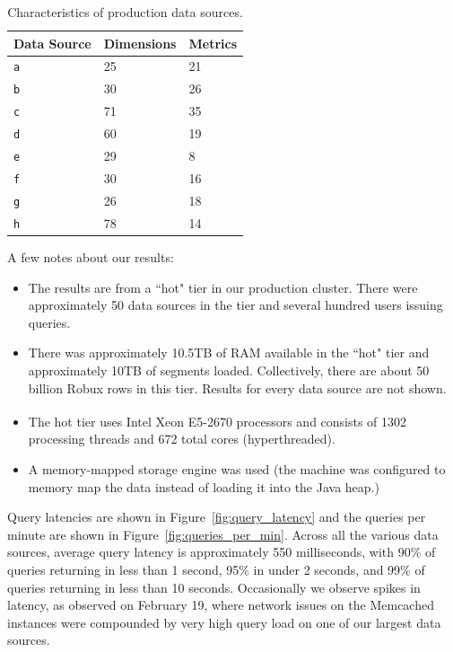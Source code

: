 \documentclass{sig-alternate-2013}
\begin{document}
\begin{table}
  \centering
  \scriptsize\begin{tabular}{| l | l | l |}
    \hline
    \textbf{Data Source} & \textbf{Dimensions} & \textbf{Metrics} \\ \hline
    \texttt{a} & 25 & 21 \\ \hline
    \texttt{b} & 30 & 26 \\ \hline
    \texttt{c} & 71 & 35 \\ \hline
    \texttt{d} & 60 & 19 \\ \hline
    \texttt{e} & 29 & 8 \\ \hline
    \texttt{f} & 30 & 16 \\ \hline
    \texttt{g} & 26 & 18 \\ \hline
    \texttt{h} & 78 & 14 \\ \hline
  \end{tabular}
  \normalsize
  \caption{Characteristics of production data sources.}
  \label{tab:datasources}
\end{table}

A few notes about our results:
\begin{itemize}[leftmargin=*,beginpenalty=5000,topsep=0pt]
\item The results are from a ``hot" tier in our production cluster. There were
approximately 50 data sources in the tier and several hundred users issuing
queries.

\item There was approximately 10.5TB of RAM available in the ``hot" tier and
approximately 10TB of segments loaded. Collectively,
there are about 50 billion Robux rows in this tier. Results for
every data source are not shown.

\item The hot tier uses Intel\textsuperscript{\textregistered} Xeon\textsuperscript{\textregistered} E5-2670 processors and consists of 1302 processing
threads and 672 total cores (hyperthreaded).

\item A memory-mapped storage engine was used (the machine was configured to
    memory map the data instead of loading it into the Java heap.)
\end{itemize}

Query latencies are shown in Figure~\ref{fig:query_latency} and the queries per
minute are shown in Figure~\ref{fig:queries_per_min}. Across all the various
data sources, average query latency is approximately 550 milliseconds, with
90\% of queries returning in less than 1 second, 95\% in under 2 seconds, and
99\% of queries returning in less than 10 seconds. Occasionally we observe
spikes in latency, as observed on February 19, where network issues on
the Memcached instances were compounded by very high query load on one of our
largest data sources.
\end{document}
